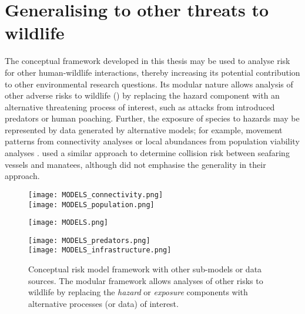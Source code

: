 \section{Generalising to other threats to wildlife}\label{other_threats}

The conceptual framework developed in this thesis may be used to analyse risk for other human-wildlife interactions, thereby increasing its potential contribution to other environmental research questions. Its modular nature allows analysis of other adverse risks to wildlife () by replacing the hazard component with an alternative threatening process of interest, such as attacks from introduced predators or human poaching. Further, the exposure of species to hazards may be represented by data generated by alternative models; for example, movement patterns from connectivity analyses \citep[e.g.][]{mcra08} or local abundances from population viability analyses \citep[e.g.][]{beis02}. \cite{baud13} used a similar approach to determine collision risk between seafaring vessels and manatees, although did not emphasise the generality in their approach.

\begin{figure*}[!h]
  \centering
  	\begin{minipage}[t][][b]{.13\textwidth}
    	\centering
    	\texttt{[image: MODELS\_connectivity.png]}\\
    	\texttt{[image: MODELS\_population.png]}   	
    \end{minipage}
    \hspace{.05\textwidth}
  	\begin{minipage}{.38\textwidth}
    	\centering
    	\texttt{[image: MODELS.png]}
    \end{minipage}
    \hspace{.05\textwidth}
  	\begin{minipage}[t][][b]{.13\textwidth}
    	\centering
    	\texttt{[image: MODELS\_predators.png]}\\
    	\texttt{[image: MODELS\_infrastructure.png]}
    \end{minipage}    	   	   
  \caption[Conceptual risk model framework for other threats]{Conceptual risk model framework with other sub-models or data sources. The modular framework allows analyses of other risks to wildlife by replacing the \textit{hazard} or \textit{exposure} components with alternative processes (or data) of interest.}
  \label{gen_framework}
\end{figure*}

